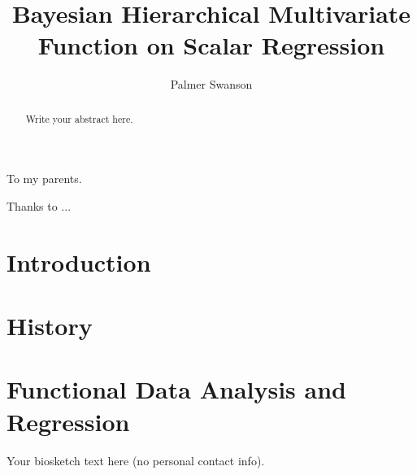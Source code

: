 \documentclass[11pt,expanded,copyright]{template/fsuthesis}
\title{Bayesian Hierarchical Multivariate Function on Scalar Regression}
\author{Palmer Swanson}
\begin{document}
\frontmatter
\maketitle
\makecommitteepage

\begin{dedication}\centering To my parents.\end{dedication}
\begin{acknowledgments}Thanks to ...\end{acknowledgments}

\tableofcontents
\listoftables
\listoffigures

\begin{abstract}
Write your abstract here.
\end{abstract}

\mainmatter

\chapter{Introduction}

\chapter{History}

\chapter{Functional Data Analysis and Regression}


\renewcommand*{\bibname}{References}
\printbibliography

\begin{biosketch}
Your biosketch text here (no personal contact info).
\end{biosketch}
\end{document}
